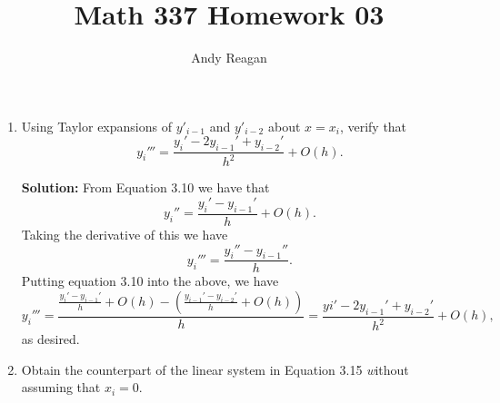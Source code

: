 \documentclass[11pt]{article}
\author{Andy Reagan}
\title{Math 337 Homework 03}
\def\f{\frac }
\begin{document}
\maketitle

\begin{enumerate}

\item Using Taylor expansions of $y'_{i-1}$ and $y'_{i-2}$ about $x = x_i$, verify that
\[ y_i ''' = \f{y_i'-2y_{i-1}'+y_{i-2}'}{h^2} + O(h) . \]

\bigskip
\textbf{Solution:} From Equation 3.10 we have that
\[ y_{i} '' = \f{y_i'-y_{i-1}'}{h} +O(h).\]
Taking the derivative of this we have
\[ y_{i} ''' = \f{y_i''-y_{i-1}''}{h} .\]
Putting equation 3.10 into the above, we have
\[ y_{i} ''' = \f{\f{y_i'-y_{i-1}'}{h} +O(h) -\left (\f{y_{i-1}'-y_{i-2}'}{h} +O(h) \right )}{h} = \f{yi'-2y_{i-1}'+y_{i-2}'}{h^2} + O(h), \]
as desired.

\item Obtain the counterpart of the linear system in Equation 3.15 {\emph without} assuming that $x_i = 0.$


\end{enumerate}
\end{document}
